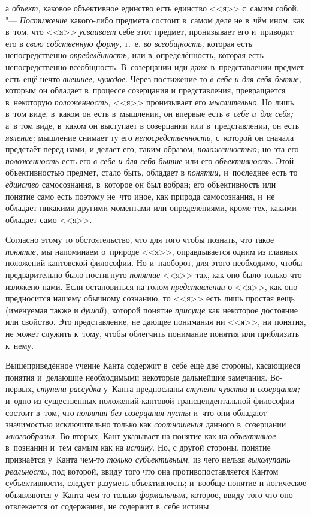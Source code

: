 а {\em объект,} каковое объективное единство есть единство <<я>> с~самим собой. "---
{\em Постижение} какого-либо предмета состоит в~самом деле не в~чём ином, как
в~том, что <<я>> {\em усваивает} себе этот предмет, пронизывает его и~приводит его
в {\em свою собственную форму,} т.~е. {\em во всеобщность,} которая есть
непосредственно {\em определённость,} или в~определённость, которая есть
непосредственно всеобщность. В~созерцании иди даже в~представлении предмет
есть ещё нечто {\em внешнее, чуждое}. Через постижение то
{\em в-себе-и-для-себя-бытие,} которым он обладает в~процессе созерцания и
представления, превращается в~некоторую {\em положенность;} <<я>> пронизывает
его {\em мыслительно}. Но лишь в~том виде, в~каком он есть в~мышлении, он
впервые есть {\em в~себе и~для себя;} а~в том виде, в~каком он выступает в
созерцании или в~представлении, он есть {\em явление;} мышление снимает ту
его {\em непосредственность,} с~которой он сначала предстаёт перед нами, и
делает его, таким образом, {\em положенностью;} но эта его {\em положенность}
есть его {\em в-себе-и-для-себя-бытие} или его {\em объективность}. Этой
объективностью предмет, стало быть, обладает в {\em понятии,} и~последнее
есть то {\em единство} самосознания, в~которое он был вобран; его
объективность или понятие само есть поэтому не~что иное, как природа
самосознания, и~не обладает никакими другими моментами или определениями,
кроме тех, какими обладает само <<я>>.

Согласно этому то обстоятельство, что для того чтобы познать, что такое
{\em понятие,} мы напоминаем о~природе <<я>>, оправдывается одним из главных
положений кантовской философии. Но и~наоборот, для этого необходимо, чтобы
предварительно было постигнуто {\em понятие} <<я>> так, как оно было только что
изложено нами. Если остановиться на голом {\em представлении} о <<я>>, как оно
предносится нашему обычному сознанию, то <<я>> есть лишь простая вещь
(именуемая также и {\em душой}), которой понятие {\em присуще} как некоторое
достояние или свойство. Это представление, не дающее понимания ни <<я>>, ни
понятия, не может служить к~тому, чтобы облегчить понимание понятия или
приблизить к~нему.

Вышеприведённое учение Канта содержит в~себе ещё две стороны,
касающиеся понятия и~делающие необходимыми некоторые дальнейшие замечания.
Во-первых, {\em ступени рассудка} у~Канта предпосланы {\em ступени чувства} и
{\em созерцания;} и~одно из существенных положений кантовой трансцендентальной
философии состоит в~том, что {\em понятия без созерцания
пусты} и~что они обладают значимостью исключительно только
как {\em соотношения} данного в~созерцании {\em многообразия}.
Во-вторых, Кант указывает на понятие как на {\em объективное}
в~познании и~тем самым как на {\em истину}. Но, с
другой стороны, понятие признаётся у~Канта чем-то {\em только субъективным,}
из чего нельзя {\em выколупать реальность,}
под которой, ввиду того что она противопоставляется Кантом
субъективности, следует разуметь объективность; и~вообще понятие и
логическое объявляются у~Канта чем-то только {\em формальным,} которое,
ввиду того что оно отвлекается от содержания, не содержит в~себе истины.

